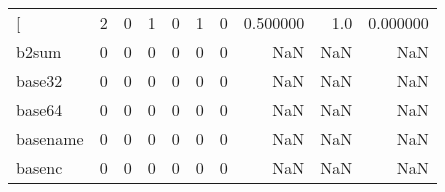 \begin{longtable}{lrrrrrrrrr}
\bottomrule
\endlastfoot
{[}         &                                       2 &                                                  0 &                                                  1 &                                                  0 &                                                  1 &                                                  0 &                                           0.500000 &                                    1.0 &                             0.000000 \\
b2sum     &                                       0 &                                                  0 &                                                  0 &                                                  0 &                                                  0 &                                                  0 &                                                NaN &                                    NaN &                                  NaN \\
base32    &                                       0 &                                                  0 &                                                  0 &                                                  0 &                                                  0 &                                                  0 &                                                NaN &                                    NaN &                                  NaN \\
base64    &                                       0 &                                                  0 &                                                  0 &                                                  0 &                                                  0 &                                                  0 &                                                NaN &                                    NaN &                                  NaN \\
basename  &                                       0 &                                                  0 &                                                  0 &                                                  0 &                                                  0 &                                                  0 &                                                NaN &                                    NaN &                                  NaN \\
basenc    &                                       0 &                                                  0 &                                                  0 &                                                  0 &                                                  0 &                                                  0 &                                                NaN &                                    NaN &                                  NaN \\

\end{longtable}
